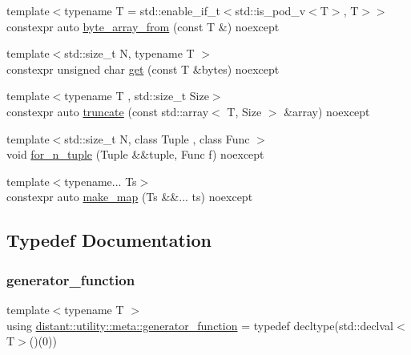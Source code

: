 \begin{DoxyCompactItemize}
\item 
{\footnotesize template$<$typename T  = std\+::enable\+\_\+if\+\_\+t$<$std\+::is\+\_\+pod\+\_\+v$<$\+T$>$, T$>$$>$ }\\constexpr auto \mbox{\hyperlink{namespacedistant_1_1utility_1_1meta_ad4b386756299c909869531eda15be187}{byte\+\_\+array\+\_\+from}} (const T \&) noexcept
\item 
{\footnotesize template$<$std\+::size\+\_\+t N, typename T $>$ }\\constexpr unsigned char \mbox{\hyperlink{namespacedistant_1_1utility_1_1meta_a0a2d71eeab17d5976879049bba34d777}{get}} (const T \&bytes) noexcept
\item 
{\footnotesize template$<$typename T , std\+::size\+\_\+t Size$>$ }\\constexpr auto \mbox{\hyperlink{namespacedistant_1_1utility_1_1meta_a3fd8f830012e6174a5098a2fbb22d0b3}{truncate}} (const std\+::array$<$ T, Size $>$ \&array) noexcept
\item 
{\footnotesize template$<$std\+::size\+\_\+t N, class Tuple , class Func $>$ }\\void \mbox{\hyperlink{namespacedistant_1_1utility_1_1meta_af56486a77acac37cd3409468d35bd69b}{for\+\_\+n\+\_\+tuple}} (Tuple \&\&tuple, Func f) noexcept
\item 
{\footnotesize template$<$typename... Ts$>$ }\\constexpr auto \mbox{\hyperlink{namespacedistant_1_1utility_1_1meta_ad53bb77fc3e8c9138d6bb147cd9f4708}{make\+\_\+map}} (Ts \&\&... ts) noexcept
\end{DoxyCompactItemize}


\subsection{Typedef Documentation}
\mbox{\label{namespacedistant_1_1utility_1_1meta_a61f75cfe650b1bcb71aa5ab01299936d}} 
\subsubsection{\texorpdfstring{generator\+\_\+function}{generator\_function}}
{\footnotesize\ttfamily template$<$typename T $>$ \\
using \mbox{\hyperlink{namespacedistant_1_1utility_1_1meta_a61f75cfe650b1bcb71aa5ab01299936d}{distant\+::utility\+::meta\+::generator\+\_\+function}} = typedef decltype(std\+::declval$<$T$>$()(0))}



